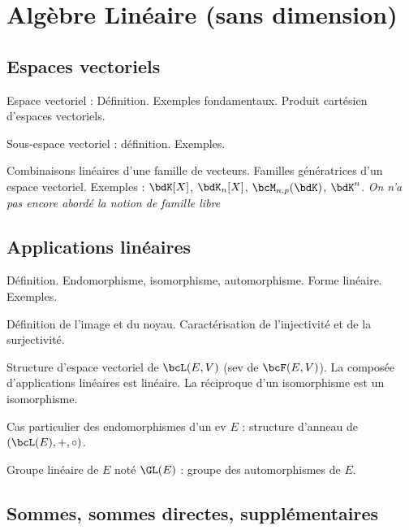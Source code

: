 \documentclass[a4paper,french,bookmarks]{article}
\begin{document}

\section*{Algèbre Linéaire (sans dimension)}

\subsection*{Espaces vectoriels}

\begin{enumerate}
    \ithand Espace vectoriel : Définition. Exemples fondamentaux. Produit cartésien d'espaces vectoriels.
    
    \ithand Sous-espace vectoriel : définition. Exemples. 
    
    \ithand Combinaisons linéaires d'une famille de vecteurs. Familles génératrices d'un espace vectoriel. Exemples : $\bdK[X]$, $\bdK_n[X]$, $\bcM_{n, p}(\bdK)$, $\bdK^n$. {\EBGaramond\itshape On n'a pas encore abordé la notion de famille libre}
    
\end{enumerate}

\subsection*{Applications linéaires}

\begin{enumerate}
    \ithand Définition. Endomorphisme, isomorphisme, automorphisme. Forme linéaire. Exemples.

    \ithand Définition de l'image et du noyau. Caractérisation de l'injectivité et de la surjectivité.
    
    \ithand Structure d'espace vectoriel de $\bcL(E, V)$ (sev de $\bcF(E, V)$). La composée d'applications linéaires est linéaire. La réciproque d'un isomorphisme est un isomorphisme.
    
    \ithand Cas particulier des endomorphismes d'un ev $E$ : structure d'anneau de $(\bcL(E), +, \circ)$.
    
    Groupe linéaire de $E$ noté $\GL(E)$ : groupe des automorphismes de $E$.
\end{enumerate}

\subsection*{Sommes, sommes directes, supplémentaires}
\end{document}
